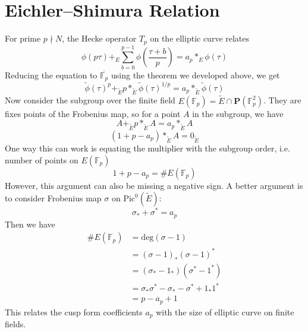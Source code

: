 \documentclass[]{article}
\begin{document}
\section{Eichler–Shimura Relation}
For prime $p\nmid N$, the Hecke operator $T_p$ on the elliptic curve relates 
\[
\phi\left(p\tau\right) +_E \sum_{b=0}^{p-1}\phi\left(\frac{\tau+b}{p}\right)  = a_p *_E \phi(\tau)
\]
Reducing the equation to $\overline{\mathbb{F}_p}$ using the theorem we developed above, we get
\[
\tilde{\phi}(\tau)^p +_{\tilde{E}} p *_{\tilde{E}} \tilde{\phi}(\tau)^{1/p} = a_p *_{\tilde{E}} \tilde{\phi}(\tau)
\]
Now consider the subgroup over the finite field $E(\mathbb{F}_p) = \tilde{E}\cap \mathbf{P}(\mathbb{F}_p^2)$. They are fixes points of the Frobenius map, so for a point $A$ in the subgroup, we have
\[
A +_{\tilde{E}} p *_{\tilde{E}} A = a_p *_{\tilde{E}} A
\]
\[
(1 + p - a_p) *_{\tilde{E}} A = 0_{\tilde{E}}
\]
One way this can work is equating the multiplier with the subgroup order, i.e. number of points on $E(\mathbb{F}_p)$
\[
1 + p - a_p = \# E(\mathbb{F}_p)
\]
However, this argument can also be missing a negative sign. A better argument is to consider Frobenius map $\sigma$ on $\mathrm{Pic}^0(\tilde{E})$:
\[
\sigma_* + \sigma^* = a_p 
\]
Then we have
\begin{align*}
\# E(\mathbb{F}_p) &= \mathrm{deg}(\sigma - 1) \\
&= (\sigma - 1)_* (\sigma - 1)^* \\
&= (\sigma_* - 1_*) (\sigma^* - 1^*) \\
&= \sigma_*\sigma^* - \sigma_* - \sigma^* + 1_*1^* \\
&= p - a_p + 1
\end{align*}
This relates the cusp form coefficients $a_p$ with the size of elliptic curve on finite fields.
\end{document}
